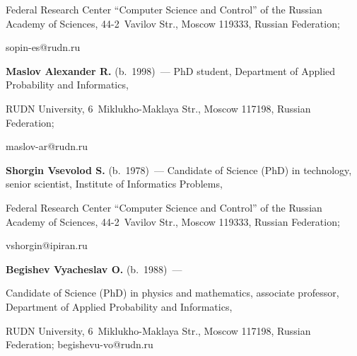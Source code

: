 Federal Research Center ``Computer Science and Control'' of the Russian Academy of Sciences, 44-2~Vavilov Str., Moscow 119333, Russian Federation; 

\mbox{sopin-es@rudn.ru}



\vspace*{3pt}



\noindent

\textbf{Maslov Alexander R.} (b.\ 1998)~--- PhD student, Department of Applied Probability and Informatics, 

RUDN University, 6~Miklukho-Maklaya Str., Moscow 117198, Russian Federation; 

\mbox{maslov-ar@rudn.ru}



\vspace*{3pt}



\noindent

\textbf{Shorgin Vsevolod S.} (b.\ 1978)~--- Candidate of Science (PhD) in technology, senior scientist, Institute of Informatics Problems,

 Federal Research Center ``Computer Science and Control'' of the Russian Academy of Sciences, 44-2~Vavilov Str., Moscow 119333, Russian Federation; 

 \mbox{vshorgin@ipiran.ru}

 

 \vspace*{3pt}



\noindent

\textbf{Begishev Vyacheslav O.} (b.\ 1988)~--- 

Candidate of Science (PhD) in physics and mathematics, associate professor, Department of Applied Probability and Informatics, 

RUDN University, 6~Miklukho-Maklaya Str., Moscow 117198, Russian Federation; \mbox{begishevu-vo@rudn.ru}







\label{end\stat}



\renewcommand{\bibname}{\protect\rm Литература} 

